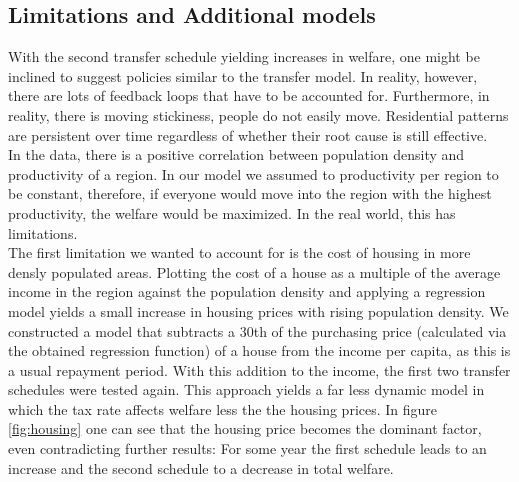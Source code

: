 \documentclass[10pt,a4paper]{article}
\begin{document}
\subsection{Limitations and Additional models}
With the second transfer schedule yielding increases in welfare, one might be inclined to suggest policies similar to the transfer model. In reality, however, there are lots of feedback loops that have to be accounted for. Furthermore, in reality, there is moving stickiness, people do not easily move. Residential patterns are persistent over time regardless of whether their root cause is still effective. \cite{heblich_east-side_2021}
\\
In the data, there is a positive correlation between population density and productivity of a region. In our model we assumed to productivity per region to be constant, therefore, if everyone would move into the region with the highest productivity, the welfare would be maximized. In the real world, this has limitations.
\\
The first limitation we wanted to account for is the cost of housing in more densly populated areas. Plotting the cost of a house as a multiple of the average income in the region against the population density and applying a regression model yields a small increase in housing prices with rising population density. We constructed a model that subtracts a 30th of the purchasing price (calculated via the obtained regression function) of a house from the income per capita, as this is a usual repayment period. With this addition to the income, the first two transfer schedules were tested again. This approach yields a far less dynamic model in which the tax rate affects welfare less the the housing prices. In figure \ref{fig:housing} one can see that the housing price becomes the dominant factor, even contradicting further results: For some year the first schedule leads to an increase and the second schedule to a decrease in total welfare.
\end{document}
